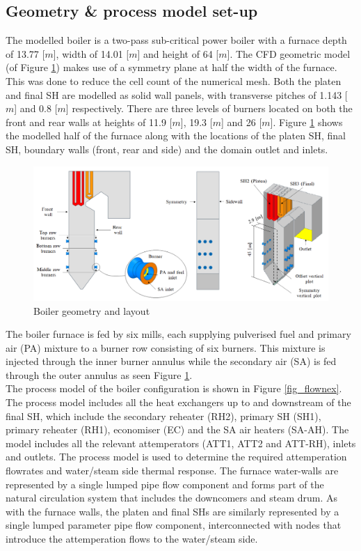 \documentclass[review]{elsarticle}
\begin{document}
\subsection{Geometry \& process model set-up}
The modelled  boiler is a two-pass sub-critical power boiler with a furnace depth of 13.77 [$m$], width of 14.01 [$m$] and height of 64 [$m$]. The CFD geometric model (of Figure \ref{fig_geometry}) makes use of a symmetry plane at half the width of the furnace. This was done to reduce the cell count of the numerical mesh. Both the platen and final SH are modelled as solid wall panels, with transverse pitches of 1.143 [$m$] and 0.8 [$m$] respectively. There are three levels of burners located on both the front and rear walls at heights of 11.9 [$m$], 19.3 [$m$] and 26 [$m$]. Figure \ref{fig_geometry} shows the modelled half of the furnace along with the locations of the platen SH, final SH, boundary walls (front, rear and side) and the domain outlet and inlets.\\
\begin{figure} [h!]
\centerline{\includegraphics[scale=0.45]{GEOMETRY}}
\caption{Boiler geometry and layout}
\label{fig_geometry}
\end{figure}

The boiler furnace is fed by six mills, each supplying pulverised fuel and primary air (PA) mixture to a burner row consisting of six burners. This mixture is injected through the inner burner annulus while the secondary air (SA) is fed through the outer annulus as seen Figure \ref{fig_geometry}.\\ 

The process model of the boiler configuration is shown in Figure \ref{fig_flownex}. The process model includes all the heat exchangers up to and downstream of the final SH, which include the secondary reheater (RH2), primary SH (SH1), primary reheater (RH1), economiser (EC) and the SA air heaters (SA-AH). The model includes all the relevant attemperators (ATT1, ATT2 and ATT-RH), inlets and outlets. The process model is used to determine the required attemperation flowrates and water/steam side thermal response. The furnace water-walls are represented by a single lumped pipe flow component and forms part of the natural circulation system that includes the downcomers and steam drum. As with the furnace walls, the platen and final SHs are similarly represented by a single lumped parameter pipe flow component, interconnected with nodes that introduce the attemperation flows to the water/steam side.\\ 
\end{document}
